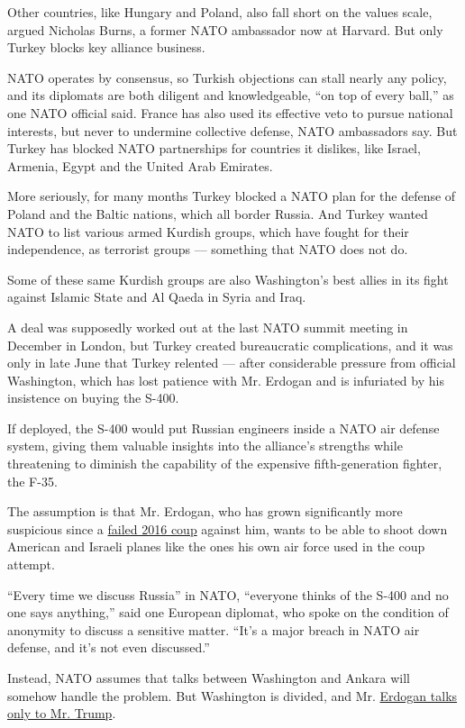 Other countries, like Hungary and Poland, also fall short on the values
scale, argued Nicholas Burns, a former NATO ambassador now at Harvard.
But only Turkey blocks key alliance business.

NATO operates by consensus, so Turkish objections can stall nearly any
policy, and its diplomats are both diligent and knowledgeable, ``on top
of every ball,'' as one NATO official said. France has also used its
effective veto to pursue national interests, but never to undermine
collective defense, NATO ambassadors say. But Turkey has blocked NATO
partnerships for countries it dislikes, like Israel, Armenia, Egypt and
the United Arab Emirates.

More seriously, for many months Turkey blocked a NATO plan for the
defense of Poland and the Baltic nations, which all border Russia. And
Turkey wanted NATO to list various armed Kurdish groups, which have
fought for their independence, as terrorist groups --- something that
NATO does not do.

Some of these same Kurdish groups are also Washington's best allies in
its fight against Islamic State and Al Qaeda in Syria and Iraq.

A deal was supposedly worked out at the last NATO summit meeting in
December in London, but Turkey created bureaucratic complications, and
it was only in late June that Turkey relented --- after considerable
pressure from official Washington, which has lost patience with Mr.
Erdogan and is infuriated by his insistence on buying the S-400.

If deployed, the S-400 would put Russian engineers inside a NATO air
defense system, giving them valuable insights into the alliance's
strengths while threatening to diminish the capability of the expensive
fifth-generation fighter, the F-35.

The assumption is that Mr. Erdogan, who has grown significantly more
suspicious since a
\href{https://www.nytimes3xbfgragh.onion/interactive/2016/07/16/world/europe/turkey-coup-photos.html}{failed
2016 coup} against him, wants to be able to shoot down American and
Israeli planes like the ones his own air force used in the coup attempt.

``Every time we discuss Russia'' in NATO, ``everyone thinks of the S-400
and no one says anything,'' said one European diplomat, who spoke on the
condition of anonymity to discuss a sensitive matter. ``It's a major
breach in NATO air defense, and it's not even discussed.''

Instead, NATO assumes that talks between Washington and Ankara will
somehow handle the problem. But Washington is divided, and Mr.
\href{https://www.nytimes3xbfgragh.onion/2020/06/10/world/europe/erdogan-trump-turkey-libya-syria.html}{Erdogan
talks only to Mr. Trump}.

